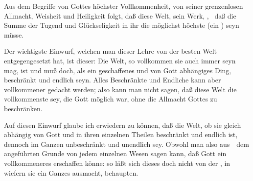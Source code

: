 \begin{aufza}
\item Aus dem Begriffe von Gottes höchster Vollkommenheit, von seiner grenzenlosen Allmacht, Weisheit und Heiligkeit folgt, daß diese Welt, sein Werk, , \dh\ daß die Summe der Tugend und Glückseligkeit in ihr die möglichst höchste (ein ) seyn müsse.
\item Der wichtigste Einwurf, welchen man dieser Lehre von der besten Welt entgegengesetzt hat, ist dieser: Die Welt, so vollkommen sie auch immer seyn mag, ist und muß doch, als ein geschaffenes und von Gott abhängiges Ding, beschränkt und endlich seyn. Alles Beschränkte und Endliche kann aber vollkommener gedacht werden; also kann man nicht sagen, daß diese Welt die vollkommenste sey, die Gott möglich war, ohne die Allmacht Gottes zu beschränken.\par
Auf diesen Einwurf glaube ich erwiedern zu können, daß die Welt, ob sie gleich abhängig von Gott und in ihren einzelnen Theilen beschränkt und endlich ist, dennoch im Ganzen unbeschränkt und unendlich sey. Obwohl man also aus~\ dem angeführten Grunde von jedem einzelnen Wesen sagen kann, daß Gott ein vollkommeneres erschaffen könne: so läßt sich dieses doch nicht von der , in wiefern sie ein Ganzes ausmacht, behaupten.

\end{aufza}
